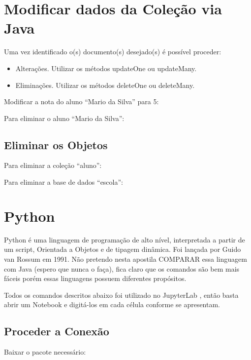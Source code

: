 \documentclass[a4paper,11pt]{article}
\begin{document}
\section{Modificar dados da Coleção via Java}
Uma vez identificado o(s) documento(s) desejado(s) é possível proceder:
\begin{itemize}[nolistsep]
  \item Alterações. Utilizar os métodos updateOne ou updateMany.
  \item Eliminações. Utilizar os métodos deleteOne ou deleteMany.
\end{itemize}

Modificar a nota do aluno ``Mario da Silva'' para 5: \\

Para eliminar o aluno ``Mario da Silva'': \\

\subsection{Eliminar os Objetos}
Para eliminar a coleção ``aluno'': \\

Para eliminar a base de dados ``escola'': \\

\section{Python}
Python é uma linguagem de programação de alto nível, interpretada a partir de um script, Orientada a Objetos e de tipagem dinâmica. Foi lançada por Guido van Rossum em 1991. Não pretendo nesta apostila COMPARAR essa linguagem com Java (espero que nunca o faça), fica claro que os comandos são bem mais fáceis porém essas linguagens possuem diferentes propósitos.

Todos os comandos descritos abaixo foi utilizado no JupyterLab \cite{jupyteroficial}, então basta abrir um Notebook e digitá-los em cada célula conforme se apresentam.

\subsection{Proceder a Conexão}
Baixar o pacote necessário: \\
\end{document}
